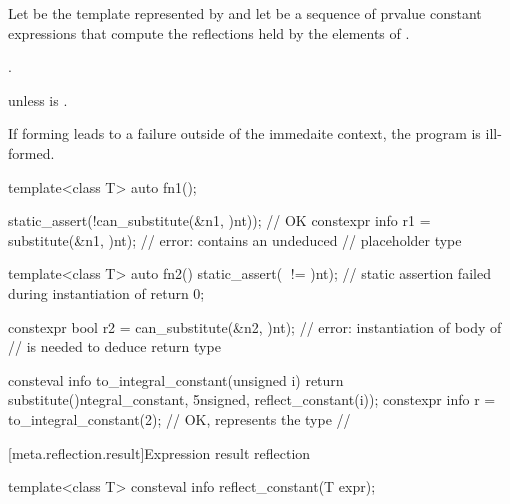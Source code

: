 \begin{itemdescr}
\pnum
Let  be the template represented by 
and let  be a sequence of prvalue constant expressions
that compute the reflections held by the elements of .

\pnum
\returns
{}.

\pnum
\throws
{} unless
 is .

\pnum
\begin{note}
If forming  leads to a failure outside of the immedaite context,
the program is ill-formed.
\end{note}

\pnum
\begin{example}
\begin{codeblock}
template<class T>
  auto fn1();

static_assert(!can_substitute(^^fn1, {^^int}));         // OK
constexpr info r1 = substitute(^^fn1, {^^int});         // error:  contains an undeduced
                                                        // placeholder type

template<class T>
  auto fn2() {
    static_assert(^^T != ^^int);    // static assertion failed during instantiation of 
    return 0;
  }

constexpr bool r2 = can_substitute(^^fn2, {^^int});     // error: instantiation of body of 
                                                        // is needed to deduce return type
\end{codeblock}
\end{example}

\pnum
\begin{example}
\begin{codeblock}
consteval info to_integral_constant(unsigned i) {
  return substitute(^^integral_constant, {^^unsigned, reflect_constant(i)});
}
constexpr info r = to_integral_constant(2);     // OK,  represents the type
                                                // 
\end{codeblock}
\end{example}
\end{itemdescr}

[meta.reflection.result]{Expression result reflection}

%
\begin{itemdecl}
template<class T>
  consteval info reflect_constant(T expr);
\end{itemdecl}

